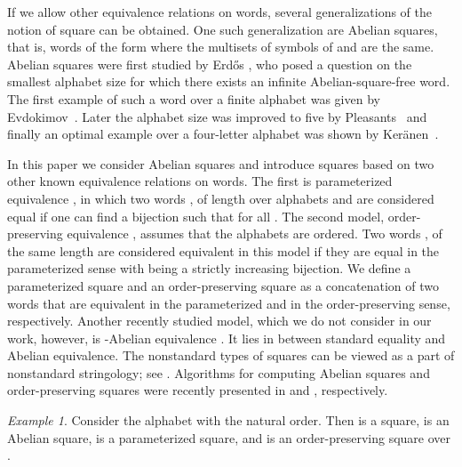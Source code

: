 \documentclass{article}
\theoremstyle{plain}
\theoremstyle{definition}
\theoremstyle{remark}
\newtheorem{example}[theorem]{Example}
\begin{document}
  If we allow other equivalence relations on words, several generalizations of the notion of square
  can be obtained.
  One such generalization are Abelian squares, that is, words of the form  where
  the multisets of symbols of  and  are the same.
  Abelian squares were first studied by Erd\H{o}s \cite{Erdos}, who posed a question on
  the smallest alphabet size for which there exists an infinite Abelian-square-free word.
  The first example of such a word over a finite alphabet was given by Evdokimov~\cite{evdokimov}.
  Later the alphabet size was improved to five by Pleasants~\cite{Pleasants}
  and finally an optimal example over a four-letter alphabet was shown by
  Ker\"anen~\cite{DBLP:conf/icalp/Keranen92}.

  In this paper we consider Abelian squares and introduce squares based
  on two other known equivalence relations on words.
  The first is parameterized equivalence \cite{DBLP:journals/jcss/Baker96}, in which two words
  ,  of length  over alphabets  and  are considered equal
  if one can find a bijection 
  such that  for all .
  The second model, order-preserving equivalence \cite{DBLP:journals/ipl/KubicaKRRW13,DBLP:journals/tcs/KimEFHIPPT14},
  assumes that the alphabets are ordered.
  Two words ,  of the same length are considered equivalent in this model if they are
  equal in the parameterized sense with  being a strictly increasing bijection.
  We define a parameterized square and an order-preserving square as a concatenation
  of two words that are equivalent in the parameterized and in the order-preserving sense, respectively.
  Another recently studied model, which we do not consider in our work, however,
  is -Abelian equivalence \cite{DBLP:journals/tcs/HuovaKS12}.
  It lies in between standard equality and Abelian equivalence.
  The nonstandard types of squares can be viewed as a part of nonstandard stringology;
  see \cite{DBLP:conf/cpm/Muthukrishnan95,Muthukrishnan:1994:NSA:195058.195457}.
  Algorithms for computing Abelian squares and order-preserving squares were recently presented
  in \cite{MACIS2015} and \cite{Crochemore2015}, respectively.

  \begin{example}
    Consider the alphabet  with the natural order.
    Then  is a square,
     is an Abelian square,
     is a parameterized square,
    and  is an order-preserving square over .
  \end{example}
\end{document}
